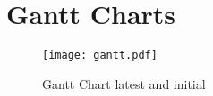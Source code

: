 \chapter{Gantt Charts}
\label{appendix:gantt-charts}

\pagebreak

\begin{sidewaysfigure}
    \centering
    \texttt{[image: gantt.pdf]}
    \caption{Gantt Chart latest and initial}
    \label{fig:gantt-chart}
\end{sidewaysfigure}